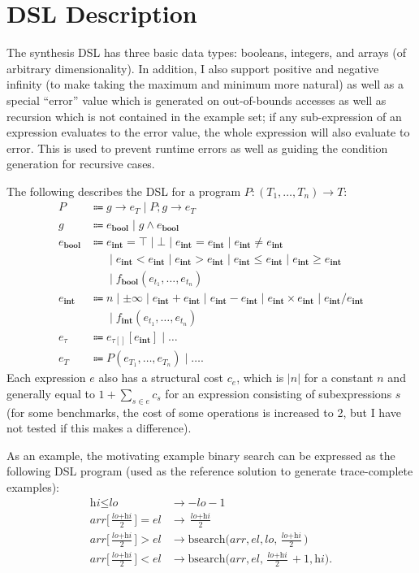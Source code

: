 \documentclass{article}
\newcommand*{\bsearch}{\textrm{bsearch}}
\newcommand*{\Aarr}{\textit{arr}}
\newcommand*{\Ael}{\textit{el}}
\newcommand*{\Alo}{\textit{lo}}
\newcommand*{\Ahi}{\textit{hi}}
\newcommand*{\Emid}{\ensuremath{\frac{\Alo + \Ahi}{2}}}
\newcommand*{\Tbool}{\textbf{bool}}
\newcommand*{\Tint}{\textbf{int}}
\begin{document}
\section{DSL Description}
The synthesis DSL has three basic data types: booleans,
integers, and arrays (of arbitrary dimensionality).
In addition, I also support positive and negative infinity
(to make taking the maximum and minimum more natural)
as well as a special ``error'' value which is generated on out-of-bounds
accesses as well as recursion which is not contained in the example set;
if any sub-expression of an
expression evaluates to the error value, the whole expression will
also evaluate to error.
This is used to prevent runtime errors as well as
guiding the condition generation for recursive cases.

The following describes the DSL for a program $P : (T_1, \dots, T_n) \to T$:
\begin{align*}
    P &\Coloneqq g \to e_T \mid P; g \to e_T \\
    g &\Coloneqq e_{\Tbool} \mid g \land e_{\Tbool} \\
    e_{\Tbool} &\Coloneqq e_{\Tint} = \top \mid \bot \mid e_{\Tint} = e_{\Tint} \mid e_{\Tint} \ne e_{\Tint} \\
    &\phantom{\Coloneqq} \mid e_{\Tint} < e_{\Tint} \mid e_{\Tint} > e_{\Tint} \mid e_{\Tint} \le e_{\Tint} \mid e_{\Tint} \ge e_{\Tint} \\
    &\phantom{\Coloneqq} \mid f_{\Tbool}(e_{t_1}, \dots, e_{t_n}) \\
    e_{\Tint} &\Coloneqq n \mid \pm\infty \mid e_{\Tint} + e_{\Tint} \mid e_{\Tint} - e_{\Tint} \mid e_{\Tint} \times e_{\Tint} \mid e_{\Tint} / e_{\Tint} \\
    &\phantom{\Coloneqq} \mid f_{\Tint}(e_{t_1}, \dots, e_{t_n}) \\
    e_\tau &\Coloneqq e_{\tau[]}[e_{\Tint}] \mid \dots \\
    e_T &\Coloneqq P(e_{T_1}, \dots, e_{T_n}) \mid \dots.
\end{align*}
Each expression $e$ also has a structural cost $c_e$, which is $\lvert n\rvert$ for a constant $n$
and generally equal to $1 + \sum_{s \in e} c_s$ for an expression consisting of subexpressions $s$
(for some benchmarks, the cost of some operations is increased to 2, but I have not tested if this
makes a difference).

As an example, the motivating example binary search can be expressed
as the following DSL program (used as the reference solution to generate
trace-complete examples):
\begin{align*}
    \Ahi \le \Alo &\to -\Alo - 1 \\
    \Aarr\biggl[\Emid\biggr] = \Ael &\to \Emid \\
    \Aarr\biggl[\Emid\biggr] > \Ael &\to \bsearch\biggl(\Aarr, \Ael, \Alo, \Emid\biggr) \\
    \Aarr\biggl[\Emid\biggr] < \Ael &\to \bsearch\biggl(\Aarr, \Ael, \Emid + 1, \Ahi\biggr).
\end{align*}
\end{document}
